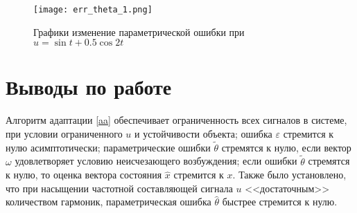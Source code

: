 \begin{figure}[p]
	\centering
	\texttt{[image: err\_theta\_1.png]}
	\caption{Графики изменение параметрической ошибки при $u = \sin{t} + 0.5 \cos{2 t}$ }
	\label{err_th_2}
\end{figure}

\clearpage
\section{Выводы по работе}
Алгоритм адаптации \eqref{aa} обеспечивает ограниченность всех сигналов в системе, при условии ограниченного $u$ и устойчивости объекта; ошибка $\varepsilon$ стремится к нулю асимптотически; параметрические ошибки $\tilde{\theta}$ стремятся к нулю, если вектор $\omega$ удовлетворяет условию неисчезающего возбуждения; если ошибки $\tilde{\theta}$ стремятся к нулю, то оценка вектора состояния $\hat{x}$ стремится к $x$. Также было установлено, что при насыщении частотной составляющей сигнала $u$ <<достаточным>> количеством гармоник, параметрическая ошибка $\hat{\theta}$ быстрее стремится к нулю.